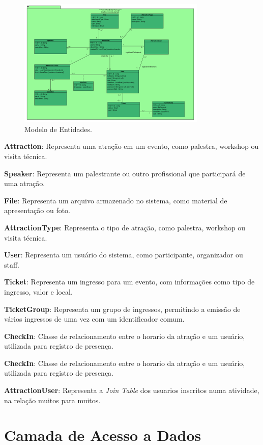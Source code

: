 \begin{figure}[h]
	\centering
	\includegraphics[width=0.8\textwidth]{figuras/ClassesDeDominio.PNG}
	\caption{Modelo de Entidades.}
	\label{figura-dominio}
\end{figure}

\textbf{Attraction}: Representa uma atração em um evento, como palestra, workshop ou visita técnica.

\textbf{Speaker}: Representa um palestrante ou outro profissional que participará de uma atração.

\textbf{File}: Representa um arquivo armazenado no sistema, como material de apresentação ou foto.

\textbf{AttractionType}: Representa o tipo de atração, como palestra, workshop ou visita técnica.

\textbf{User}: Representa um usuário do sistema, como participante, organizador ou staff.

\textbf{Ticket}: Representa um ingresso para um evento, com informações como tipo de ingresso, valor e local.

\textbf{TicketGroup}: Representa um grupo de ingressos, permitindo a emissão de vários ingressos de uma vez com um identificador comum.

\textbf{CheckIn}: Classe de relacionamento entre o horario da atração e um usuário, utilizada para registro de presença.

\textbf{CheckIn}: Classe de relacionamento entre o horario da atração e um usuário, utilizada para registro de presença.

\textbf{AttractionUser}: Representa a \textit{Join Table} dos usuarios inscritos numa atividade, na relação muitos para muitos.


\section{Camada de Acesso a Dados}
\label{sec-frameweb-dados}


